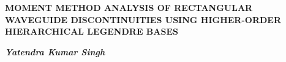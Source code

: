 \thispagestyle{plain}
\begin{center}
\vspace*{0.5cm}
{\Large \bf MOMENT METHOD ANALYSIS OF RECTANGULAR WAVEGUIDE DISCONTINUITIES USING HIGHER-ORDER HIERARCHICAL LEGENDRE BASES\\}
\end{center}



\vspace{14cm}
\begin{flushright}
\begin{large}
{\bf {\em Yatendra Kumar Singh ~~}\noindent}
\end{large}
\end{flushright}
